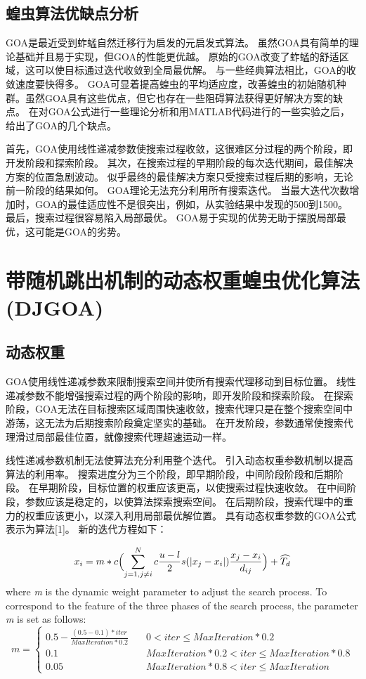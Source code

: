 \subsection{蝗虫算法优缺点分析}
GOA是最近受到蚱蜢自然迁移行为启发的元启发式算法。 虽然GOA具有简单的理论基础并且易于实现，但GOA的性能更优越。 原始的GOA改变了蚱蜢的舒适区域，这可以使目标通过迭代收敛到全局最优解。 与一些经典算法相比，GOA的收敛速度要快得多。 GOA可显着提高蝗虫的平均适应度，改善蝗虫的初始随机种群。虽然GOA具有这些优点，但它也存在一些阻碍算法获得更好解决方案的缺点。 在对GOA公式进行一些理论分析和用MATLAB代码进行的一些实验之后，给出了GOA的几个缺点。

首先，GOA使用线性递减参数使搜索过程收敛，这很难区分过程的两个阶段，即开发阶段和探索阶段。 其次，在搜索过程的早期阶段的每次迭代期间，最佳解决方案的位置急剧波动。 似乎最终的最佳解决方案只受搜索过程后期的影响，无论前一阶段的结果如何。 GOA理论无法充分利用所有搜索迭代。 当最大迭代次数增加时，GOA的最佳适应性不是很突出，例如，从实验结果中发现的500到1500。 最后，搜索过程很容易陷入局部最优。 GOA易于实现的优势无助于摆脱局部最优，这可能是GOA的劣势。


\section{带随机跳出机制的动态权重蝗虫优化算法(DJGOA)}
\subsection{动态权重}
GOA使用线性递减参数来限制搜索空间并使所有搜索代理移动到目标位置。 线性递减参数不能增强搜索过程的两个阶段的影响，即开发阶段和探索阶段。 在探索阶段，GOA无法在目标搜索区域周围快速收敛，搜索代理只是在整个搜索空间中游荡，这无法为后期搜索阶段奠定坚实的基础。 在开发阶段，参数通常使搜索代理滑过局部最佳位置，就像搜索代理超速运动一样。

线性递减参数机制无法使算法充分利用整个迭代。 引入动态权重参数机制以提高算法的利用率。 搜索进度分为三个阶段，即早期阶段，中间阶段阶段和后期阶段。 在早期阶段，目标位置的权重应该更高，以使搜索过程快速收敛。 在中间阶段，参数应该是稳定的，以使算法探索搜索空间。 在后期阶段，搜索代理中的重力的权重应该更小，以深入利用局部最优解位置。 具有动态权重参数的GOA公式表示为算法[1]。 新的迭代方程如下：

\begin{equation}
    x_i = m*c \Bigl(\sum_{j=1,j\neq{i}}^N c \frac{u-l}{2}s (\lvert x_j-x_i \rvert )\frac{x_j-x_i}{d_{ij}} \Bigr) + \widehat{T_d}
\end{equation}
where \emph{m} is the dynamic weight parameter to adjust the search process. To correspond to the feature of the three phases of the search process, the parameter \emph{m} is set as follows:
\begin{equation}
    m= \begin{cases}
        0.5-\frac{(0.5-0.1)*iter}{MaxIteration*0.2} & \quad 0<iter\leq MaxIteration*0.2 \\
        0.1&\quad MaxIteration*0.2<iter \leq MaxIteration*0.8 \\
        0.05& \quad  MaxIteration*0.8 < iter \leq MaxIteration
        \end{cases} 
\end{equation}

